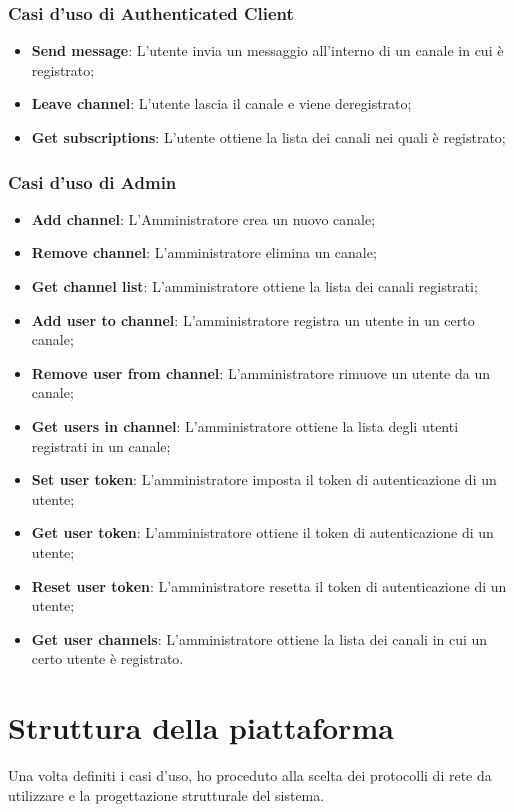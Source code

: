 		\subsubsection{Casi d'uso di Authenticated Client}
		\begin{itemize}
			\item \textbf{Send message}: L'utente invia un messaggio all'interno di un canale in cui è registrato; 
			\item \textbf{Leave channel}: L'utente lascia il canale e viene deregistrato; 
			\item \textbf{Get subscriptions}: L'utente ottiene la lista dei canali nei quali è registrato; 
		\end{itemize}

		\subsubsection{Casi d'uso di Admin}
		\begin{itemize}
			\item \textbf{Add channel}: L'Amministratore crea un nuovo canale;
			\item \textbf{Remove channel}: L'amministratore elimina un canale;
			\item \textbf{Get channel list}: L'amministratore ottiene la lista dei canali registrati;
			\item \textbf{Add user to channel}: L'amministratore registra un utente in un certo canale;
			\item \textbf{Remove user from channel}: L'amministratore rimuove un utente da un canale;
			\item \textbf{Get users in channel}: L'amministratore ottiene la lista degli utenti registrati in un canale;
			\item \textbf{Set user token}: L'amministratore imposta il token di autenticazione di un utente;
			\item \textbf{Get user token}: L'amministratore ottiene il token di autenticazione di un utente;
			\item \textbf{Reset user token}: L'amministratore resetta il token di autenticazione di un utente;
			\item \textbf{Get user channels}: L'amministratore ottiene la lista dei canali in cui un certo utente è registrato.
		\end{itemize}
		

\section{Struttura della piattaforma}
Una volta definiti i casi d'uso, ho proceduto alla scelta dei protocolli di rete da utilizzare e la progettazione strutturale del sistema.
